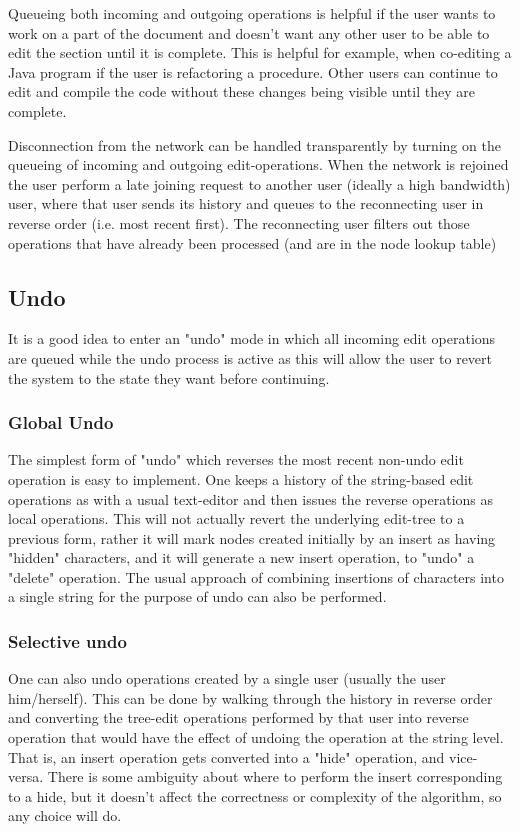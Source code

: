 \documentclass{amsart}
\begin{document}
Queueing both incoming and outgoing operations is helpful if the user wants to
work on a part of the document and doesn't want any other user to be able to
edit the section until it is complete.  This is helpful for example, when
co-editing a Java program if the user is refactoring a procedure. Other users
can continue to edit and compile the code without these changes being visible
until they are complete.

Disconnection from the network can be handled transparently by turning on the
queueing of incoming and outgoing edit-operations. When the network is rejoined
the user perform a late joining request to another user (ideally a high bandwidth)
user, where that user sends its history and queues to the reconnecting user
in reverse order (i.e. most recent first). The reconnecting user filters out
those operations that have already been processed (and are in the 
node lookup table)

\subsection{Undo}

It is a good idea to enter an "undo" mode in which all incoming edit operations
are queued while the undo process is active as this will allow the user to
revert the system to the state they want before continuing.

\subsubsection{Global Undo}
The simplest form of "undo" which reverses the most recent non-undo edit operation
is easy to implement.  One keeps a history of the string-based edit operations
as with a usual text-editor and then issues the reverse operations as local
operations.  This will not actually revert the underlying edit-tree to a previous
form, rather it will mark nodes created initially by an insert as having
"hidden" characters, and it will generate a new insert operation, to "undo"
a "delete" operation. The usual approach of combining insertions of characters
into a single string for the purpose of undo can also be performed.  


\subsubsection{Selective undo}
One can also undo operations created by a single user (usually the user
him/herself). This can be done by walking through the history in reverse
order and converting the tree-edit operations performed by that user into
reverse operation that would have the effect of undoing the operation
at the string level.  That is, an insert operation gets converted into a
"hide" operation, and vice-versa. There is some ambiguity about where to
perform the insert corresponding to a hide, but it doesn't affect the 
correctness or complexity of the algorithm, so any choice will do.
\end{document}
